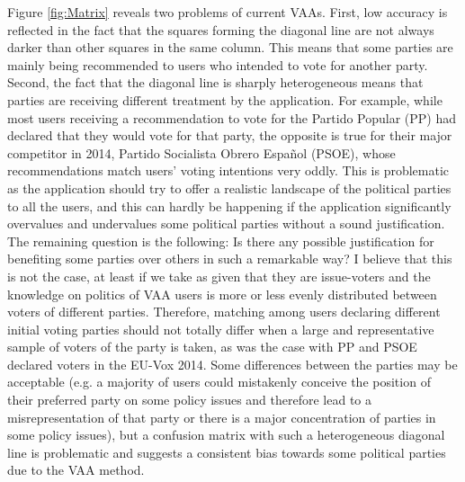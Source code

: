 \documentclass{scrartcl}
\begin{document}
Figure \ref{fig:Matrix} reveals two problems of current VAAs. First, low accuracy is reflected in the fact that the squares forming the diagonal line are not always darker than other squares in the same column. This means that some parties are mainly being  recommended to users who intended to vote for another party. Second, the fact that the diagonal line is sharply heterogeneous means that parties are receiving different treatment by the application. For example, while most users receiving a recommendation to vote for the Partido Popular (PP) had declared that they would vote for that party, the opposite is true for their major competitor in 2014, Partido Socialista Obrero Español (PSOE), whose recommendations match users' voting intentions very oddly. This is problematic as the application should try to offer a realistic landscape of the political parties to all the users, and this can hardly be happening if the application significantly overvalues and undervalues some political parties without a sound justification. The remaining question is the following: Is there any possible justification for benefiting some parties over others in such a remarkable way? I believe that this is not the case, at least if we take as given that they are issue-voters and the knowledge on politics of VAA users is more or less evenly distributed between voters of different parties. Therefore, matching among users declaring different initial voting parties should not totally differ when a large and representative sample of voters of the party is taken, as was the case with PP and PSOE declared voters in the EU-Vox 2014. Some differences between the parties may be acceptable (e.g. a majority of users could mistakenly conceive the position of their preferred party on some policy issues and therefore lead to a misrepresentation of that party or there is a major concentration of parties in some policy issues), but a confusion matrix with such a heterogeneous diagonal line is problematic and suggests a consistent bias towards some political parties due to the VAA method. 
\\
\end{document}
